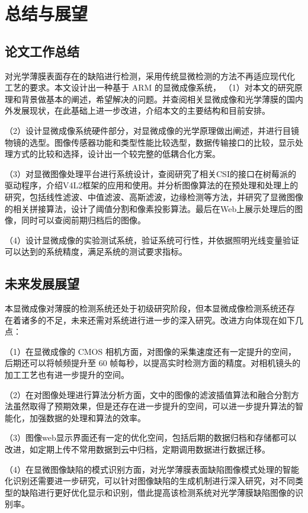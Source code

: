 \chapter{总结与展望}
\section{论文工作总结}
对光学薄膜表面存在的缺陷进行检测，采用传统显微检测的方法不再适应现代化 工艺的要求。本文设计出一种基于 ARM 的显微成像系统，
（1）对本文的研究原理和背景做基本的阐述，希望解决的问题。并查阅相关显微成像和光学薄膜的国内外发展现状，在此基础上进一步改进，介绍本文的主要结构和目前安排。

（2）设计显微成像系统硬件部分，对显微成像的光学原理做出阐述，并进行目镜物镜的选型。图像传感器功能和类型性能比较选型，数据传输接口的比较，显示处理方式的比较和选择，设计出一个较完整的低耦合化方案。

（3）对显微图像处理平台进行系统设计，查阅研究了相关CSI的接口在树莓派的驱动程序，介绍V4L2框架的应用和使用。并分析图像算法的在预处理和处理上的研究，包括线性滤波、中值滤波、高斯滤波，边缘检测等方法，并研究了显微图像的相关拼接算法，设计了阈值分割和像素投影算法。最后在Web上展示处理后的图像，同时可以查阅前期归档后的图像。

（4）设计显微成像的实验测试系统，验证系统可行性，并依据照明光线变量验证可以达到的系统精度，满足系统的测试要求指标。


\section{未来发展展望}
本显微成像对薄膜的检测系统还处于初级研究阶段，但本显微成像检测系统还存 在着诸多的不足，未来还需对系统进行进一步的深入研究。改进方向体现在如下几点： 

（1）在显微成像的 CMOS 相机方面，对图像的采集速度还有一定提升的空间， 后期还可以将帧频提升至 60 帧每秒，以提高实时检测方面的精度。对相机镜头的加工工艺也有进一步提升的空间。

（2）在对图像处理进行算法分析方面，文中的图像的滤波插值算法和融合分割方法虽然取得了预期效果，但是还存在进一步提升的空间，可以进一步提升算法的智能化，加强数据的处理和算法的效率。

（3）图像web显示界面还有一定的优化空间，包括后期的数据归档和存储都可以改进，如定期上传不常用数据到云中归档，定期调用数据进行数据迁移。

（4）在显微图像缺陷的模式识别方面，对光学薄膜表面缺陷图像模式处理的智能化识别还需要进一步研究，可以针对图像缺陷的生成机制进行深入研究，对不同类型的缺陷进行更好优化显示和识别，借此提高该检测系统对光学薄膜缺陷图像的识别率。 



